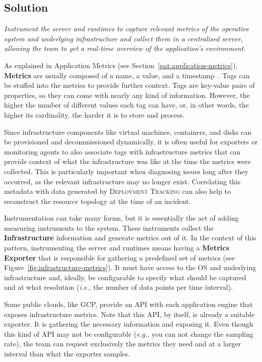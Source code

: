 \documentclass[runningheads]{llncs}
\begin{document}
\subsection{Solution}
\textit{Instrument the server and runtimes to capture relevant metrics of the operative system and underlying infrastructure and collect them in a centralised server, allowing the team to get a real-time overview of the application's environment.}
\vspace{0.3cm}

As explained in Application Metrics (see Section~\ref{pat:application-metrics}), \textbf{Metrics} are usually composed of a name, a value, and a timestamp~\cite{Richardson-Book-2018}. Tags can be stuffed into the metrics to provide further context. Tags are key-value pairs of properties, so they can come with nearly any kind of information. However, the higher the number of different values each tag can have, or, in other words, the higher its cardinality, the harder it is to store and process.

Since infrastructure components like virtual machines, containers, and disks can be provisioned and decommissioned dynamically, it is often useful for exporters or monitoring agents to also associate tags with infrastructure metrics that can provide context of what the infrastructure was like at the time the metrics were collected. This is particularly important when diagnosing issues long after they occurred, as the relevant infrastructure may no longer exist. Correlating this metadata with data generated by \textsc{Deployment Tracking} can also help to reconstruct the resource topology at the time of an incident.

Instrumentation can take many forms, but it is essentially the act of adding measuring instruments to the system. These instruments collect the \textbf{Infrastructure} information and generate metrics out of it. In the context of this pattern, instrumenting the server and runtimes means having a \textbf{Metrics Exporter} that is responsible for gathering a predefined set of metrics (see Figure~\ref{fig:infrastructure-metrics}). It must have access to the OS and underlying infrastructure and, ideally, be configurable to specify what should be captured and at what resolution (\textit{i.e.}, the number of data points per time interval).

Some public clouds, like GCP, provide an API with each application engine that exposes infrastructure metrics. Note that this API, by itself, is already a suitable exporter. It is gathering the necessary information and exposing it. Even though this kind of API may not be configurable (\textit{e.g.}, you can not change the sampling rate), the team can request exclusively the metrics they need and at a larger interval than what the exporter samples.
\end{document}
